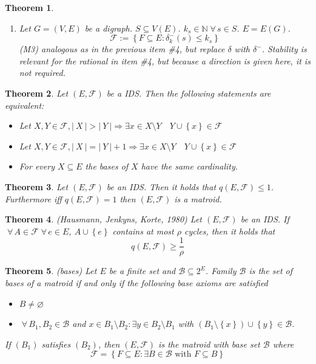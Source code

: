 \documentclass{article}
\newtheorem{theorem}{Theorem}
\newcommand{\card}[1]{\left|\:\!#1\:\!\right|}
\newcommand{\set}[1]{\left\{#1\right\}}
\newcommand{\fall}{\;\forall\,}
\begin{document}
\begin{theorem}
\begin{enumerate}
      \[
        \Rightarrow \card{X}
            = \sum_{s \in S'} \delta_X(s) \leq \sum_{s \in S'} ks
            = \sum_{s \in S'} \delta y(s) = \card{Y}
      \] \[
        \card{X} \leq \card{Y}
      \]
      Contradiction to the assumption.

    \item Let $G = (V, E)$ be a digraph. $S \subseteq V(E)$. $k_s \in \mathbb{N} \fall s \in S$. $E = E(G)$.
      \[ \mathcal{F} := \set{F \subseteq E: \delta_k^-(s) \leq k_s} \]
      (M3) analogous as in the previous item \#4, but replace $\delta$ with $\delta^-$.
      Stability is relevant for the rational in item \#4, but because a direction is given here, it is not required.
  \end{enumerate}
\end{theorem}
\begin{theorem}
  \label{satz-6.2}
  Let $(E, \mathcal{F})$ be a IDS. Then the following statements are equivalent:
  \begin{itemize}
    \item[M3:] Let $X, Y \in \mathcal{F}, \card{X} > \card{Y} \Rightarrow \exists x \in X \setminus Y \quad Y \cup \set{x} \in \mathcal{F}$
    \item[M3':] Let $X, Y \in \mathcal{F}, \card{X} = \card{Y} + 1 \Rightarrow \exists x \in X \setminus Y \quad Y \cup \set{x} \in \mathcal{F}$
    \item[M3'':] For every $X \subseteq E$ the bases of $X$ have the same cardinality.
  \end{itemize}
\end{theorem}
\begin{theorem}
  \label{proposition-8.3}
  Let $(E, \mathcal{F})$ be an IDS. Then it holds that $q(E, \mathcal{F}) \leq 1$.
  Furthermore iff $q(E, \mathcal{F}) = 1$ then $(E, \mathcal{F})$ is a matroid.
\end{theorem}
\begin{theorem}
  \label{satz-8.4}
  (Hausmann, Jenkyns, Korte, 1980)
  Let $(E, \mathcal{F})$ be an IDS. If $\fall A \in \mathcal{F} \fall e \in E$,
  $A \cup \set{e}$ contains at most $\rho$ cycles, then it holds that
  \[ q(E, \mathcal{F}) \geq \frac{1}{\rho} \]
\end{theorem}
\begin{theorem}
  \label{satz-8.5}
  (bases)
  Let $E$ be a finite set and $\mathcal{B} \subseteq 2^E$. Family $\mathcal{B}$ is the set of bases of a matroid if and only if the following base axioms are satisfied
  \begin{itemize}
    \item[(B1)] $B \neq \diameter$
    \item[(B2)] $\fall B_1, B_2 \in \mathcal{B}$ and $x \in B_1 \setminus B_2: \exists y \in B_2 \setminus B_1$ with $(B_1 \setminus \set{x}) \cup \set{y} \in \mathcal{B}$.
  \end{itemize}
  If $(B_1)$ satisfies $(B_2)$, then $(E, \mathcal{F})$ is the matroid with base set $\mathcal{B}$ where
  \[ \mathcal{F} = \set{F \subseteq E: \exists B \in \mathcal{B} \text{ with } F \subseteq B} \]
\end{theorem}
\end{document}
